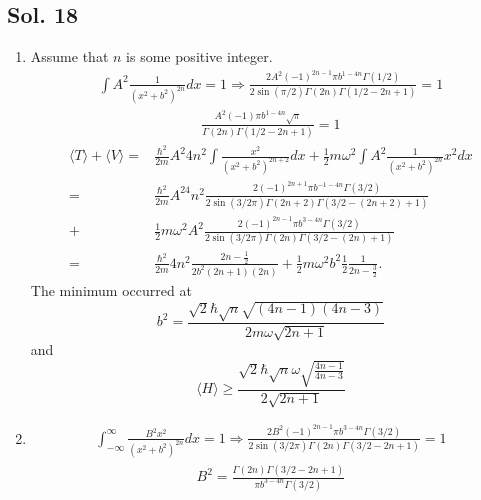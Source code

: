 \subsection*{Sol. 18}
\begin{enumerate}
    \item 
    Assume that $n$ is some positive integer.
    \begin{align*}
        \int A^2\frac{1}{(x^2+b^2)^{2n}}dx = 1
        \Rightarrow 
        \frac{2A^2(-1)^{2n-1}\pi b^{1-4n}\Gamma(1/2)}
        {2\sin(\pi/2)\Gamma(2n)\Gamma(1/2-2n+1)}=1
    \end{align*}
    \begin{align*}
        \frac{A^2(-1)\pi b^{1-4n}\sqrt{\pi}}
        {\Gamma(2n)\Gamma(1/2-2n+1)}=1
    \end{align*}
    \begin{align*}
        \langle T \rangle
        +\langle V\rangle
        =&
        \frac{\hbar^2}{2m}
        A^2 4n^2
        \int 
        \frac{x^2}{(x^2+b^2)^{2n+2}}dx
        +
        \frac{1}{2}m\omega^2\int 
        A^2 
        \frac{1}{(x^2+b^2)^{2n}}x^2dx\\
        =&
        \frac{\hbar^2}{2m}A^24n^2
       \frac{2(-1)^{2n+1}\pi b^{-1-4n}\Gamma(3/2)}
       {2\sin(3/2\pi)\Gamma(2n+2)\Gamma(3/2-(2n+2)+1)}\\
       +&\frac{1}{2}m\omega^2 
       A^2 
       \frac{2(-1)^{2n-1}\pi b^{3-4n}\Gamma(3/2)}
       {2\sin(3/2\pi)\Gamma(2n)\Gamma(3/2-(2n)+1)}\\
       =&
       \frac{\hbar^2}{2m}4n^2 
       \frac{2n-\frac{1}{2}}{2b^2(2n+1)(2n)}
       +\frac{1}{2}m\omega^2b^2\frac{1}{2}\frac{1}{2n-\frac{3}{2}}.
    \end{align*}
    The minimum occurred at 
    $$
    b^2=\frac{\sqrt{2} \hbar \sqrt{n} \sqrt{(4n-1)(4n-3)}}{2 m \omega \sqrt{2 n + 1}}
    $$
    and 
    $$
    \langle H\rangle\geq 
    \frac{\sqrt{2} \hbar \sqrt{n} \omega \sqrt{\frac{4 n - 1}{4 n - 3}}}{2 \sqrt{2 n + 1}}
    $$
    \item 
    \begin{align*}
        \int_{-\infty}^{\infty} \frac{B^2x^2}{(x^2+b^2)^{2n}}dx = 1
        \Rightarrow 
        \frac{2B^2(-1)^{2n-1}\pi b^{3-4n}\Gamma(3/2)}
        {2\sin(3/2\pi)\Gamma(2n)\Gamma(3/2-2n+1)}=1
    \end{align*}
    \begin{align*}
        B^2=
        \frac
        {\Gamma(2n)\Gamma(3/2-2n+1)}
        {\pi b^{3-4n}\Gamma(3/2)}
    \end{align*}

\end{enumerate}
